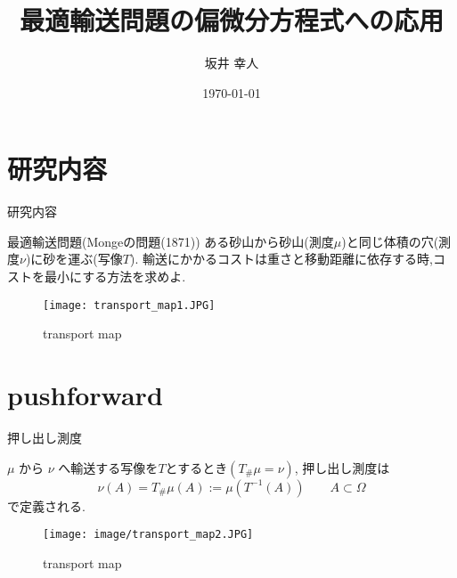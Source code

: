 \documentclass[aspectratio=169, dvipdfmx, 12pt]{beamer}
\title{最適輸送問題の偏微分方程式への応用}
\author[坂井 幸人]{坂井 幸人}
\institute[数物科学専攻 1年]{数物科学専攻 1年}
\date{\today}
\begin{document}
\frame{\maketitle}


\begin{comment}
\begin{frame}{目次}
    \tableofcontents
\end{frame}
\end{comment}


\section{研究内容}
\begin{frame}{研究内容}
    \begin{block}{最適輸送問題(Mongeの問題(1871))}
        ある砂山から砂山(測度$\mu$)と同じ体積の穴(測度$\nu$)に砂を運ぶ(写像$T$).
        輸送にかかるコストは重さと移動距離に依存する時,コストを最小にする方法を求めよ.
    \end{block}
\begin{figure}[htbp]
	\begin{center}
        \texttt{[image: transport\_map1.JPG]}
        \caption{transport map}
	\end{center}
\end{figure}


\end{frame}

\section{pushforward}
\begin{frame}{押し出し測度}
    
    \begin{definition}
        $\mu$ から $\nu$ へ輸送する写像を$T$とするとき$(T_\#\mu = \nu)$,
        押し出し測度は
        \begin{equation*}
            \nu (A) =  T_\#\mu (A) := \mu (T^{-1} (A)) \qquad A \subset \Omega
        \end{equation*}
        で定義される.
    \end{definition}

    \begin{figure}[htbp]
        \begin{center}
            \texttt{[image: image/transport\_map2.JPG]}
            \caption{transport map}
        \end{center}
    \end{figure}
\end{frame}
\end{document}
